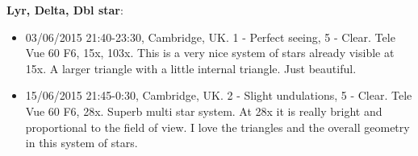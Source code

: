 {\bf Lyr, Delta, Dbl star}:
\begin{itemize}
\item 03/06/2015 21:40-23:30, Cambridge, UK. 1 - Perfect seeing, 5 - Clear. Tele Vue 60 F6, 15x, 103x. This is a very nice system of stars already visible at 15x. A larger triangle with a little internal triangle. Just beautiful.
\item 15/06/2015 21:45-0:30, Cambridge, UK. 2 - Slight undulations, 5 - Clear. Tele Vue 60 F6, 28x. Superb multi star system. At 28x it is really bright and proportional to the field of view. I love the triangles and the overall geometry in this system of stars.
\end{itemize}
